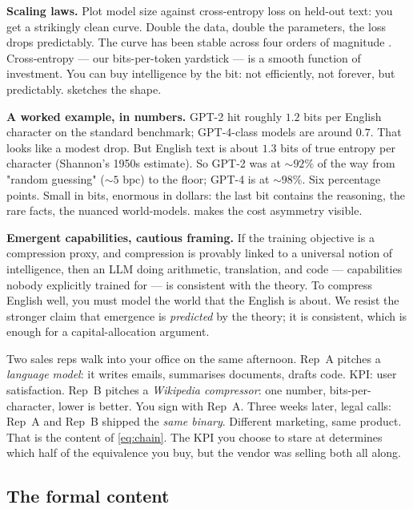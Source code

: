 \documentclass[12pt,a4paper]{article}
\theoremstyle{plain}
\theoremstyle{definition}
\begin{document}
\begin{intuition}
\textbf{Scaling laws.}  Plot model size against cross-entropy loss
on held-out text: you get a strikingly clean curve.  Double the
data, double the parameters, the loss drops predictably.  The curve
has been stable across four orders of magnitude
\citep{kaplan2020scaling}.  Cross-entropy --- our bits-per-token
yardstick --- is a smooth function of investment.  You can buy
intelligence by the bit: not efficiently, not forever, but
predictably.   sketches the shape.

\textbf{A worked example, in numbers.}  GPT-2 hit roughly $1.2$
bits per English character on the standard benchmark; GPT-4-class
models are around $0.7$.  That looks like a modest drop.  But
English text is about $1.3$ bits of true entropy per character
(Shannon's 1950s estimate).  So GPT-2 was at $\sim 92\%$ of the
way from "random guessing" ($\sim 5$ bpc) to the floor; GPT-4 is
at $\sim 98\%$.  Six percentage points.  Small in bits, enormous
in dollars: the last bit contains the reasoning, the rare facts,
the nuanced world-models.   makes the cost
asymmetry visible.

\textbf{Emergent capabilities, cautious framing.}  If the training
objective is a compression proxy, and compression is provably
linked to a universal notion of intelligence, then an LLM doing
arithmetic, translation, and code --- capabilities nobody
explicitly trained for --- is consistent with the theory.  To
compress English well, you must model the world that the English
is about.  We resist the stronger claim that emergence is
\emph{predicted} by the theory; it is consistent, which is enough
for a capital-allocation argument.
\end{intuition}

\begin{story}
Two sales reps walk into your office on the same afternoon.  Rep~A
pitches a \emph{language model}: it writes emails, summarises
documents, drafts code.  KPI: user satisfaction.  Rep~B pitches a
\emph{Wikipedia compressor}: one number, bits-per-character, lower
is better.  You sign with Rep~A.  Three weeks later, legal calls:
Rep~A and Rep~B shipped the \emph{same binary}.  Different
marketing, same product.  That is the content of \cref{eq:chain}.
The KPI you choose to stare at determines which half of the
equivalence you buy, but the vendor was selling both all along.
\end{story}

\subsection*{The formal content}
\end{document}
